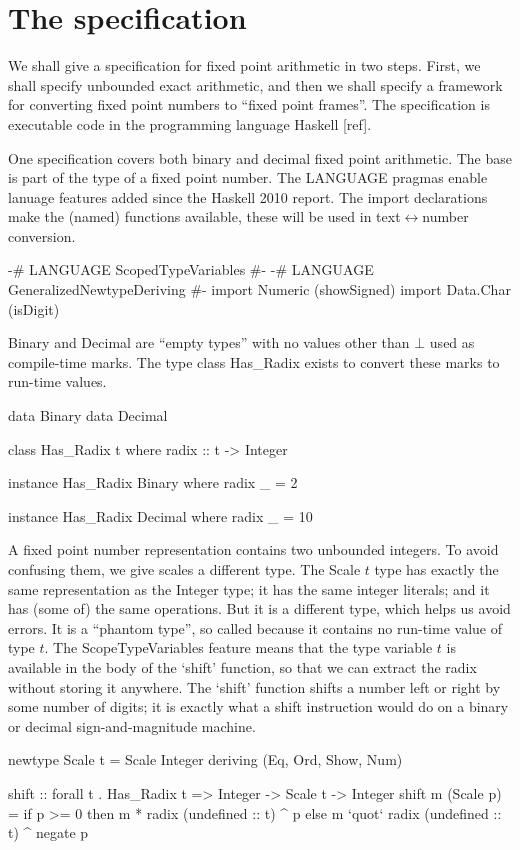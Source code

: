 \documentclass{article}
\begin{document}
\section{The specification}

We shall give a specification for fixed point arithmetic in two
steps.  First, we shall specify unbounded exact arithmetic, and
then we shall specify a framework for converting fixed point
numbers to ``fixed point frames''.  The specification is executable
code in the programming language Haskell [ref].

One specification covers both binary and decimal fixed point
arithmetic.  The base is part of the type of a fixed point number.
The LANGUAGE pragmas enable lanuage features added since the
Haskell 2010 report.  The import declarations make the (named)
functions available, these will be used in text$\leftrightarrow$number
conversion.
\begin{code}
{-# LANGUAGE ScopedTypeVariables #-}
{-# LANGUAGE GeneralizedNewtypeDeriving #-}
import Numeric (showSigned)
import Data.Char (isDigit)
\end{code}
Binary and Decimal are ``empty types'' with no values other
than $\bot$ used as compile-time marks.  The type class
Has\_Radix exists to convert these marks to run-time values.
\begin{code}
data Binary
data Decimal

class Has_Radix t
  where radix :: t -> Integer

instance Has_Radix Binary
  where radix _ = 2

instance Has_Radix Decimal
  where radix _ = 10
\end{code}

A fixed point number representation contains two unbounded integers.
To avoid confusing them, we give scales a different type.  The
Scale $t$ type has exactly the same representation as the Integer type;
it has the same integer literals; and it has (some of) the same
operations.  But it is a different type, which helps us avoid errors.
It is a ``phantom type'', so called because it
contains no run-time value of type $t$.  The ScopeTypeVariables
feature means that the type variable $t$ is available in the body
of the `shift' function, so that we can extract the radix without
storing it anywhere.  The `shift' function shifts a number left or
right by some number of digits; it is exactly what a shift instruction
would do on a binary or decimal sign-and-magnitude machine.

\begin{code}
newtype Scale t = Scale Integer
                  deriving (Eq, Ord, Show, Num)

shift :: forall t . Has_Radix t => Integer -> Scale t -> Integer
shift m (Scale p) =
  if p >= 0 then m * radix (undefined :: t) ^ p
  else m `quot` radix (undefined :: t) ^ negate p
\end{code}
\end{document}
